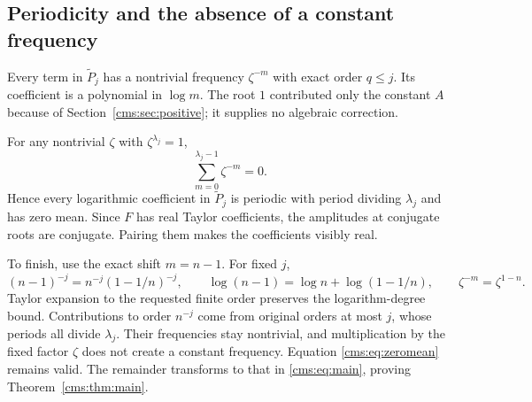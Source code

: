 \subsection{Periodicity and the absence of a constant frequency}
Every term in $\widetilde P_j$ has a nontrivial frequency $\zeta^{-m}$ with exact order $q\leq j$. Its coefficient is a polynomial in $\log m$. The root $1$ contributed only the constant $A$ because of Section~\ref{cms:sec:positive}; it supplies no algebraic correction.

For any nontrivial $\zeta$ with $\zeta^{\lambda_j}=1$,
\begin{equation}\label{cms:eq:zeromean}
\sum_{m=0}^{\lambda_j-1}\zeta^{-m}=0.
\end{equation}
Hence every logarithmic coefficient in $\widetilde P_j$ is periodic with period dividing $\lambda_j$ and has zero mean. Since $F$ has real Taylor coefficients, the amplitudes at conjugate roots are conjugate. Pairing them makes the coefficients visibly real.

To finish, use the exact shift $m=n-1$. For fixed $j$,
\[
(n-1)^{-j}=n^{-j}(1-1/n)^{-j},\qquad
\log(n-1)=\log n+\log(1-1/n),\qquad
\zeta^{-m}=\zeta^{1-n}.
\]
Taylor expansion to the requested finite order preserves the logarithm-degree bound. Contributions to order $n^{-j}$ come from original orders at most $j$, whose periods all divide $\lambda_j$. Their frequencies stay nontrivial, and multiplication by the fixed factor $\zeta$ does not create a constant frequency. Equation \eqref{cms:eq:zeromean} remains valid. The remainder transforms to that in \eqref{cms:eq:main}, proving Theorem~\ref{cms:thm:main}.

